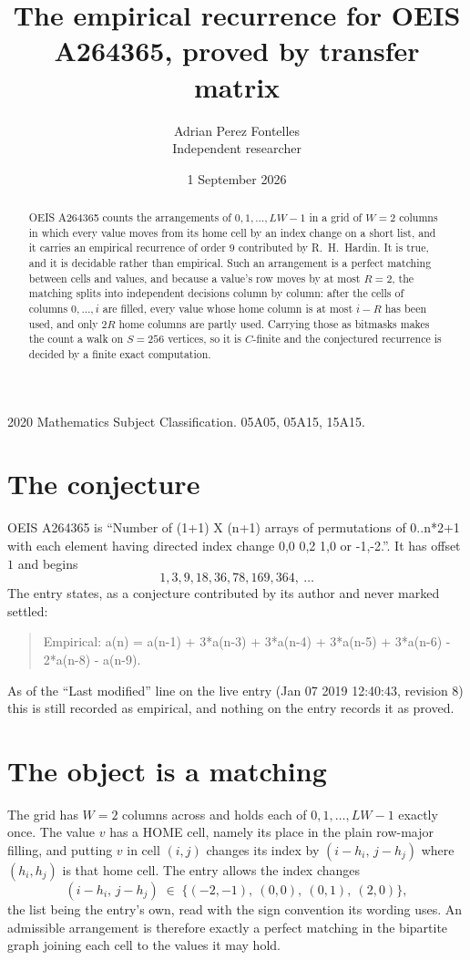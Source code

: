 \documentclass[11pt,a4paper]{article}
\title{The empirical recurrence for OEIS A264365, proved by transfer matrix}
\author{Adrian Perez Fontelles\\ \small Independent researcher}
\date{1 September 2026}
\theoremstyle{plain}
\theoremstyle{definition}
\begin{document}
\maketitle

\begin{abstract}
OEIS A264365 counts the arrangements of $0,1,\dots,LW-1$ in a grid of $W=2$ columns in which
every value moves from its home cell by an index change on a short list, and it carries an
empirical recurrence of order $9$ contributed by R.~H.~Hardin. It is true, and it is
decidable rather than empirical. Such an arrangement is a perfect matching between cells and
values, and because a value's row moves by at most $R=2$, the matching splits into
independent decisions column by column: after the cells of columns $0,\dots,i$ are filled,
every value whose home column is at most $i-R$ has been used, and only $2R$ home columns are
partly used. Carrying those as bitmasks makes the count a walk on $S=256$ vertices, so it is
$C$-finite and the conjectured recurrence is decided by a finite exact computation.
\end{abstract}

\noindent\small 2020 Mathematics Subject Classification. 05A05, 05A15, 15A15.\normalsize

\section{The conjecture}

OEIS A264365 is ``Number of (1+1) X (n+1) arrays of permutations of 0..n*2+1 with each element having directed index change 0,0 0,2 1,0 or -1,-2.''. It has offset $1$ and begins
\[
1, 3, 9, 18, 36, 78, 169, 364,\ \dots
\]
The entry states, as a conjecture contributed by its author and never marked settled:
\begin{quote}
Empirical: a(n) = a(n-1) + 3*a(n-3) + 3*a(n-4) + 3*a(n-5) + 3*a(n-6) - 2*a(n-8) - a(n-9).
\end{quote}
As of the ``Last modified'' line on the live entry (Jan 07 2019 12:40:43, revision 8) this is still
recorded as empirical, and nothing on the entry records it as proved.

\section{The object is a matching}

The grid has $W=2$ columns across and holds each of $0,1,\dots,LW-1$ exactly once. The value
$v$ has a HOME cell, namely its place in the plain row-major filling, and putting $v$ in cell
$(i,j)$ changes its index by $(i-h_i,\,j-h_j)$ where $(h_i,h_j)$ is that home cell. The entry
allows the index changes
\[
(i-h_i,\,j-h_j)\;\in\;\{(-2,-1),\ (0,0),\ (0,1),\ (2,0)\},
\]
the list being the entry's own, read with the sign convention its wording uses. An admissible
arrangement is therefore exactly a perfect matching in the bipartite graph joining each cell to
the values it may hold.
\end{document}
